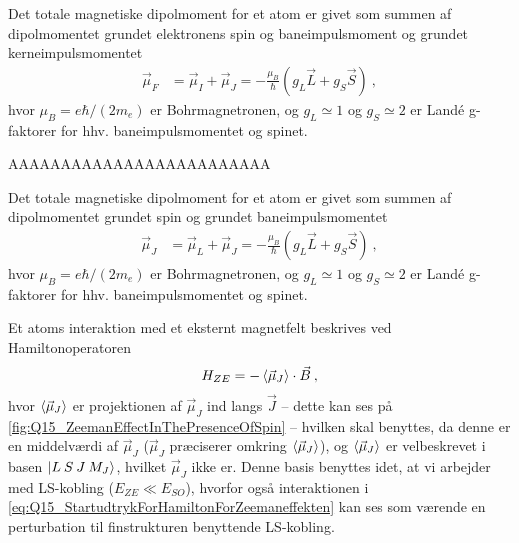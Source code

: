 Det totale magnetiske dipolmoment for et atom er givet som summen af dipolmomentet grundet elektronens spin og baneimpulsmoment og grundet kerneimpulsmomentet
\begin{align}
    \Vec{\mu}_F &= \Vec{\mu}_I + \Vec{\mu}_J = - \frac{\mu_B}{\hbar} \left( g_L \Vec{L} + g_S \Vec{S} \right) \: ,
\end{align}
hvor $\mu_B = e\hbar/(2m_e)$ er Bohrmagnetronen, og $g_L \simeq 1$ og $g_S \simeq 2$ er Landé g-faktorer for hhv. baneimpulsmomentet og spinet.

AAAAAAAAAAAAAAAAAAAAAAAAA



Det totale magnetiske dipolmoment for et atom er givet som summen af dipolmomentet grundet spin og grundet baneimpulsmomentet
\begin{align}
    \Vec{\mu}_J &= \Vec{\mu}_L + \Vec{\mu}_J = - \frac{\mu_B}{\hbar} \left( g_L \Vec{L} + g_S \Vec{S} \right) \: ,
\end{align}
hvor $\mu_B = e\hbar/(2m_e)$ er Bohrmagnetronen, og $g_L \simeq 1$ og $g_S \simeq 2$ er Landé g-faktorer for hhv. baneimpulsmomentet og spinet.

Et atoms interaktion med et eksternt magnetfelt beskrives ved Hamiltonoperatoren
\begin{align} \label{eq:Q15_StartudtrykForHamiltonForZeemaneffekten}
    H_{ZE} = -\Braket{\Vec{\mu}_J} \cdot \Vec{B} \: ,
\end{align}
hvor $\Braket{\Vec{\mu}_J}$ er projektionen af $\Vec{\mu}_J$ ind langs $\Vec{J}$ -- dette kan ses på \cref{fig:Q15_ZeemanEffectInThePresenceOfSpin}
-- hvilken skal benyttes, da denne er en middelværdi af $\Vec{\mu}_J$ ($\Vec{\mu}_J$ præciserer omkring $\Braket{\Vec{\mu}_J}$), og $\Braket{\Vec{\mu}_J}$ er velbeskrevet i basen $\ket{L \: S \: J \: M_J}$, hvilket $\Vec{\mu}_J$ ikke er. Denne basis benyttes idet, at vi arbejder med LS-kobling ($E_{ZE} \ll E_{SO}$), hvorfor også interaktionen i \cref{eq:Q15_StartudtrykForHamiltonForZeemaneffekten} kan ses som værende en perturbation til finstrukturen benyttende LS-kobling.

